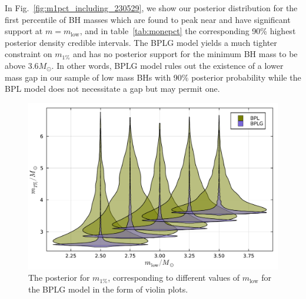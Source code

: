 \documentclass[modern]{aastex631}
\begin{document}
In Fig.~\ref{fig:m1pct_including_230529}, we show our posterior distribution for the first percentile of BH masses which are found to peak near and have significant support at $m=m_\mathrm{low}$, and in table~\ref{tab:monepct} the corresponding 90\% highest posterior density credible intervals. The BPLG model yields a much tighter constraint on $m_{1\%}$ and has no posterior support for the minimum BH mass to be above $3.6M_{\odot}$. In other words, BPLG model rules out the existence of a lower mass gap in our sample of low mass BHs with 90\% posterior probability while the BPL model does not necessitate a gap but may permit one.



\begin{figure}
     \includegraphics[width=\columnwidth]{figures/violin_plot.pdf}
     \caption{\label{fig:m1pct_including_230529_varying} The posterior for $m_{1\%}$, corresponding to different values of $m_{\mathrm{low}}$ for the BPLG model in the form of violin plots.}
 \end{figure}
\end{document}
